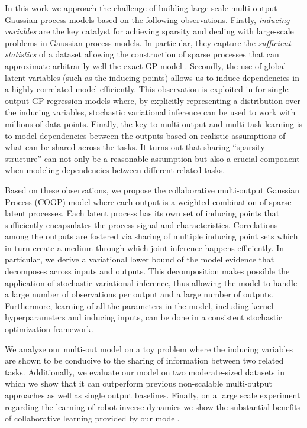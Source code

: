 In this work we approach the challenge of building large scale multi-output Gaussian process models  
based on the following observations.
Firstly, \emph{inducing variables} are the key catalyst
for achieving sparsity and dealing with large-scale problems in Gaussian process models.
In particular, they capture the \emph{sufficient statistics} of a dataset allowing the construction of sparse 
processes that can approximate arbitrarily well the exact GP model \citep{titsias2009variational}.
Secondly, the use of global latent variables (such as the inducing points) allows us to 
induce dependencies in a highly correlated model efficiently. 
This observation is exploited in \cite{hensmangaussian} for single output GP regression models 
where, by explicitly representing a distribution over the inducing variables, stochastic variational inference 
can be used to work with millions of data points.
Finally, the key to multi-output and multi-task learning is to model dependencies between the outputs  
based on realistic assumptions of what can be shared across the tasks. It turns out that 
sharing  ``sparsity structure'' can not only be a reasonable assumption but also a crucial component
when modeling dependencies between different related tasks.


Based on these observations, we propose the collaborative multi-output Gaussian Process (COGP) model 
where each output is a weighted combination of sparse latent processes.
 Each latent process has its own set of inducing points that sufficiently encapsulates the process signal and characteristics.
Correlations among the outputs are fostered via sharing of multiple inducing point sets 
which in turn create a medium through which joint inference happens efficiently.
In particular, we derive a variational lower bound of the model evidence that decomposes across 
inputs and outputs. 
This decomposition makes possible the application of stochastic variational inference, 
thus allowing the model to handle a large number of observations per output and a large number of outputs.
Furthermore, learning of all  the  parameters in the model, including
kernel hyperparameters and inducing inputs, can be done in a consistent stochastic optimization framework.

We analyze our multi-out model on a toy problem  where the inducing variables are shown to be 
conducive to the sharing of information between two related tasks. 
Additionally, we  evaluate  our model on two moderate-sized datasets in which we show that it
can outperform previous non-scalable multi-output approaches as well as single output baselines.
Finally, on a  large scale experiment regarding the learning of robot inverse dynamics we show 
the substantial benefits of collaborative learning provided by our model.
  
